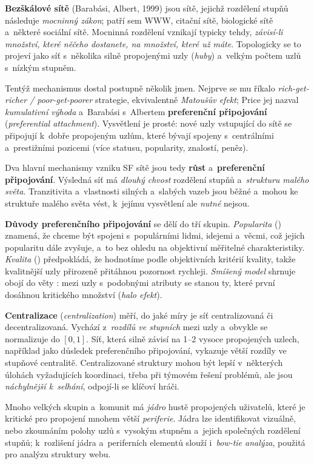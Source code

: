 \documentclass[11pt,a4paper]{article}
\theoremstyle{definition}
\begin{document}
\begin{defbox}
\textbf{Bezškálové sítě} (Barabási, Albert, 1999) jsou sítě, jejichž rozdělení stupňů
následuje \emph{mocninný zákon}; patří sem WWW, citační sítě, biologické sítě a~některé
sociální sítě. Mocninná rozdělení vznikají typicky tehdy, \emph{závisí-li množství, které
něčeho dostanete, na množství, které už máte}. Topologicky se to projeví jako síť s~několika
silně propojenými uzly (\emph{huby}) a~velkým počtem uzlů s~nízkým stupněm.

Tentýž mechanismus dostal postupně několik jmen. Nejprve se mu říkalo
\emph{rich-get-richer / poor-get-poorer} strategie, ekvivalentně \emph{Matoušův efekt}; Price
jej nazval \emph{kumulativní výhoda} a~Barabási s~Albertem \textbf{preferenční připojování}
(\emph{preferential attachment}). Vysvětlení je prosté: nové uzly vstupující do sítě se
připojují k~dobře propojeným uzlům, které bývají spojeny s~centrálními a~prestižními pozicemi
(více statusu, popularity, znalostí, peněz).

Dva hlavní mechanismy vzniku SF sítě jsou tedy \textbf{růst} a~\textbf{preferenční
připojování}. Výsledná síť má \emph{dlouhý chvost} rozdělení stupňů a~\emph{strukturu malého
světa}. Tranzitivita a~vlastnosti silných a~slabých vazeb jsou běžné a~mohou ke struktuře
malého světa vést, k~jejímu vysvětlení ale \emph{nutné} nejsou.

\textbf{Důvody preferenčního připojování} se dělí do tří skupin. \emph{Popularita}
() znamená, že chceme být spojeni s~populárními lidmi, idejemi a~věcmi,
což jejich popularitu dále zvyšuje, a~to bez ohledu na objektivní měřitelné charakteristiky.
\emph{Kvalita} () předpokládá, že hodnotíme podle objektivních kritérií
kvality, takže kvalitnější uzly přirozeně přitáhnou pozornost rychleji. \emph{Smíšený model}
shrnuje obojí do věty : mezi uzly s~podobnými atributy se  stanou ty, které první dosáhnou
kritického množství (\emph{halo efekt}).
\end{defbox}

\begin{defbox}
\textbf{Centralizace} (\emph{centralization}) měří, do jaké míry je síť centralizovaná či
decentralizovaná. Vychází z~\emph{rozdílů ve stupních} mezi uzly a~obvykle se normalizuje do
$[0,1]$. Síť, která silně závisí na 1--2 vysoce propojených uzlech, například jako důsledek
preferenčního připojování, vykazuje větší rozdíly ve stupňové centralitě. Centralizované
struktury mohou být lepší v~některých úlohách vyžadujících koordinaci, třeba při týmovém
řešení problémů, ale jsou \emph{náchylnější k~selhání}, odpojí-li se klíčoví hráči.

Mnoho velkých skupin a~komunit má \emph{jádro} hustě propojených uživatelů, které je kritické
pro propojení mnohem větší \emph{periferie}. Jádra lze identifikovat vizuálně, nebo zkoumáním
polohy uzlů s~vysokým stupněm a~jejich společných rozdělení stupňů; k~rozlišení jádra
a~periferních elementů slouží i~\emph{bow-tie analýza}, použitá pro analýzu struktury webu.
\end{defbox}
\end{document}
